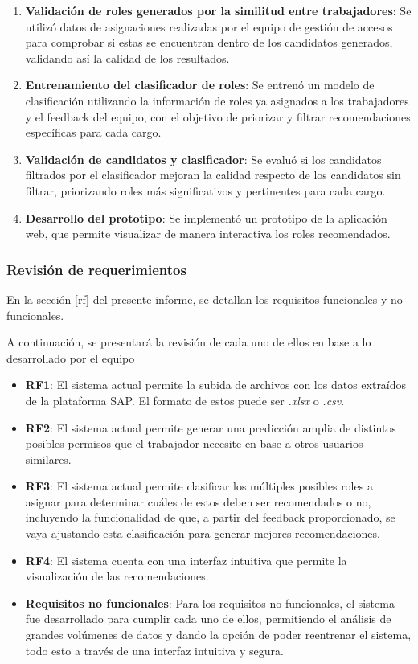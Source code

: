 \documentclass[11pt,letterpaper]{article}
\begin{document}
\begin{enumerate}
\item
  \textbf{Validación de roles generados por la similitud entre trabajadores}: Se
  utilizó datos de asignaciones realizadas por el equipo de gestión de
  accesos para comprobar si estas se encuentran dentro de los candidatos
  generados, validando así la calidad de los resultados.
\item
  \textbf{Entrenamiento del clasificador de roles}: Se entrenó un modelo de
  clasificación utilizando la información de roles ya asignados a los
  trabajadores y el feedback del equipo, con el objetivo de priorizar y
  filtrar recomendaciones específicas para cada cargo.
\item
  \textbf{Validación de candidatos y clasificador}: Se evaluó si los candidatos
  filtrados por el clasificador mejoran la calidad respecto de los
  candidatos sin filtrar, priorizando roles más significativos y
  pertinentes para cada cargo.
\item
  \textbf{Desarrollo del prototipo}: Se implementó un prototipo de la aplicación
  web, que permite visualizar de manera interactiva los roles
  recomendados.
\end{enumerate}

\hypertarget{revisiuxf3n-de-requerimientos}{%
\subsubsection{Revisión de
requerimientos}\label{revisiuxf3n-de-requerimientos}}

En la sección \autoref{rf} del presente informe, se detallan los requisitos
funcionales y no funcionales.

A continuación, se presentará la revisión de cada uno de ellos en base a
lo desarrollado por el equipo

\begin{itemize}
\tightlist
\item
  \textbf{RF1}: El sistema actual permite la subida de archivos con los
  datos extraídos de la plataforma SAP. El formato de estos puede ser
  \emph{.xlsx} o \emph{.csv}.
\item
  \textbf{RF2}: El sistema actual permite generar una predicción amplia
  de distintos posibles permisos que el trabajador necesite en base a
  otros usuarios similares.
\item
  \textbf{RF3}: El sistema actual permite clasificar los múltiples
  posibles roles a asignar para determinar cuáles de estos deben ser
  recomendados o no, incluyendo la funcionalidad de que, a partir del
  feedback proporcionado, se vaya ajustando esta clasificación para
  generar mejores recomendaciones.
\item
  \textbf{RF4}: El sistema cuenta con una interfaz intuitiva que permite
  la visualización de las recomendaciones.
\item
  \textbf{Requisitos no funcionales}: Para los requisitos no
  funcionales, el sistema fue desarrollado para cumplir cada uno de
  ellos, permitiendo el análisis de grandes volúmenes de datos y dando
  la opción de poder reentrenar el sistema, todo esto a través de una
  interfaz intuitiva y segura.
\end{itemize}
\end{document}
